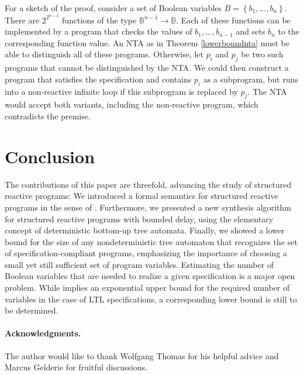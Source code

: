 \documentclass[submission,copyright,creativecommons]{eptcs}
\newcommand{\ignore}[1]{}
\newcommand{\set}[1]{\left\{ #1 \right\}}
\begin{document}
For a sketch of the proof,
consider a set of Boolean variables $B = \set{b_1,\dotsc,b_n}$.
There are $2^{2^{n-1}}$ functions of the type
$\mathbb{B}^{n-1} \to \mathbb{B}$.
Each of these functions can be implemented by a program that checks the values
of $b_1,\dotsc,b_{n-1}$ and sets $b_n$ to the corresponding function value.
An NTA as in Theorem \ref{lowerboundnta} must be able to distinguish
all of these programs.
Otherwise, let $p_i$ and $p_j$ be two such programs that cannot be
distinguished by the NTA.
We could then construct a program that satisfies the specification and
contains $p_i$ as a subprogram, but runs into a non-reactive infinite loop
if this subprogram is replaced by $p_j$.
The NTA would accept both variants, including the non-reactive program,
which contradicts the premise.


\section{Conclusion}

The contributions of this paper are threefold,
advancing the study of structured reactive programs:
We introduced a formal semantics for structured reactive programs in the sense
of \cite{madhusudan:LIPIcs:2011:3247}.
Furthermore, we presented a new synthesis algorithm for structured reactive
programs with bounded delay, using the elementary concept of deterministic
bottom-up tree automata.
Finally, we showed a lower bound for the size of any nondeterministic tree
automaton that recognizes the set of specification-compliant programs,
emphasizing the importance of choosing a small yet still sufficient set of
program variables.
Estimating the number of Boolean variables that are needed to realize a given
specification is a major open problem.
While \cite{rosner} implies an exponential upper bound for the required
number of variables in the case of LTL specifications, a corresponding lower
bound is still to be determined.

\ignore{
We presented a new synthesis algorithm for structured reactive programs with
bounded delay using the elementary concept of deterministic bottom-up tree
automata.
Our approach yields a characterization of the behavior of a program in the
form of signatures, which can be deduced from the signatures of the
subprograms.
We showed a lower bound for the size of any nondeterministic tree automaton
that recognizes the set of specification-compliant programs,
emphasizing the importance of choosing a small yet still sufficient set of
program variables.
A major open problem is the estimation of the number of Boolean variables
that are needed to realize a given specification.
While \cite{rosner} implies an exponential upper bound for the required
number of variables in the case of LTL specifications, a corresponding lower
bound is still to be determined.
}

\paragraph*{Acknowledgments.}
The author would like to thank Wolfgang Thomas for his helpful advice and
Marcus Gelderie\ignore{TODO: Insert.} for fruitful discussions.




\end{document}
